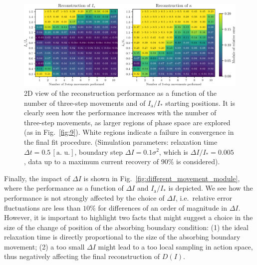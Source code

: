 \begin{figure}[htp]
    \centering
    \includegraphics[width=\textwidth]{4_probing_the_diffusive_behavior/figs/final/MULTI_different_samples.pdf}
    \caption{2D view of the reconstruction performance as a function of the number of three-step movements and of $I_\mathrm{a}/I_\ast$ starting positions. It is clearly seen how the performance increases with the number of three-step movements, as larger regions of phase space are explored (as in Fig.~\ref{fig:9}). White regions indicate a failure in convergence in the final fit procedure. (Simulation parameters: relaxation time $\Delta t=0.5 \, [\text{a. u.}]$, boundary step $\Delta I=0.1 \sigma^2$, which is $\Delta I / I_\ast = 0.005$, data up to a maximum current recovery of $90\%$ is considered).}
    \label{fig:different_nsamples}
\end{figure}

Finally, the impact of $\Delta I$ is shown in Fig.~\ref{fig:different_movement_module}, where the performance as a function of $\Delta I$ and $I_\mathrm{a}/I_\ast$ is depicted.  We see how the performance is not strongly affected by the choice of $\Delta I$, i.e.\ relative error fluctuations are less than $10\%$ for differences of an order of magnitude in $\Delta I$. However, it is important to highlight two facts that might suggest a choice in the size of the change of position of the absorbing boundary condition: (1) the ideal relaxation time is directly proportional to the size of the absorbing boundary movement; (2) a too small $\Delta I$ might lead to a too local sampling in action space, thus negatively affecting the final reconstruction of $D(I)$. 

